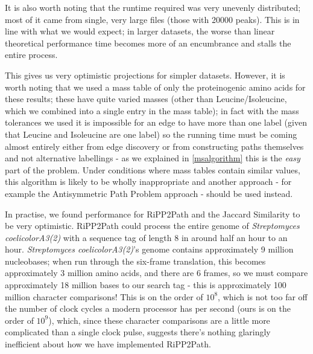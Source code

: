 \documentclass{l4proj}
\newcommand{\cit}[1]{\citep{#1}}
\begin{document}
It is also worth noting that the runtime required was very unevenly distributed; most of it came from single, very large files (those with 20000 peaks). This is in line with what we would expect; in larger datasets, the worse than linear theoretical performance time becomes more of an encumbrance and stalls the entire process.

This gives us very optimistic projections for simpler datasets. However, it is worth noting that we used a mass table of only the proteinogenic amino acids for these results; these have quite varied masses (other than Leucine/Isoleucine, which we combined into a single entry in the mass table); in fact with the mass tolerances we used it is impossible for an edge to have more than one label (given that Leucine and Isoleucine are one label) so the running time must be coming almost entirely either from edge discovery or from constructing paths themselves and not alternative labellings - as we explained in \ref{msalgorithm} this is the \textit{easy} part of the problem. Under conditions where mass tables contain similar values, this algorithm is likely to be wholly inappropriate and another approach - for example the Antisymmetric Path Problem approach \cit{msbook} - should be used instead.

In practise, we found performance for RiPP2Path and the Jaccard Similarity to be very optimistic. RiPP2Path could process the entire genome of \textit{Streptomyces coelicolorA3(2)} with a sequence tag of length 8 in around half an hour to an hour. \textit{Streptomyces coelicolorA3(2)}'s genome contains approximately 9 million nucleobases; when run through the six-frame translation, this becomes approximately 3 million amino acids, and there are 6 frames, so we must compare approximately 18 million bases to our search tag - this is approximately 100 million character comparisons! This is on the order of \(10^8\), which is not too far off the number of clock cycles a modern processor has per second (ours is on the order of \(10^9\)), which, since these character comparisons are a little more complicated than a single clock pulse, suggests there's nothing glaringly inefficient about how we have implemented RiPP2Path.
\end{document}
